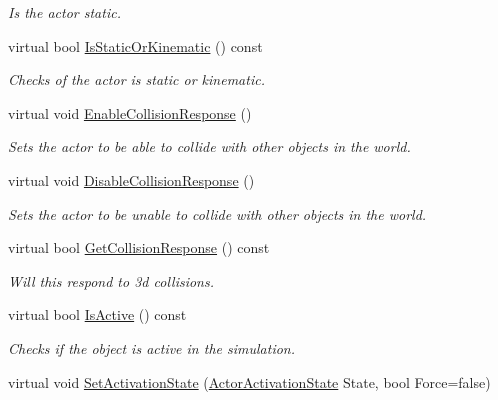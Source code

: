 \begin{DoxyCompactItemize}
\begin{DoxyCompactList}\small\item\em Is the actor static. \item\end{DoxyCompactList}\item 
virtual bool \hyperlink{classphys_1_1ActorBasePhysicsSettings_a5fe007187584b836ada963f8a23eb377}{IsStaticOrKinematic} () const 
\begin{DoxyCompactList}\small\item\em Checks of the actor is static or kinematic. \item\end{DoxyCompactList}\item 
virtual void \hyperlink{classphys_1_1ActorBasePhysicsSettings_aeb1dafd6d1e4875bf89be4de93208c03}{EnableCollisionResponse} ()
\begin{DoxyCompactList}\small\item\em Sets the actor to be able to collide with other objects in the world. \item\end{DoxyCompactList}\item 
virtual void \hyperlink{classphys_1_1ActorBasePhysicsSettings_a89e61d914542bb6e16e22e7f39ba26c1}{DisableCollisionResponse} ()
\begin{DoxyCompactList}\small\item\em Sets the actor to be unable to collide with other objects in the world. \item\end{DoxyCompactList}\item 
virtual bool \hyperlink{classphys_1_1ActorBasePhysicsSettings_aa131aa28b9e5c7a53c65c4e229f13ed1}{GetCollisionResponse} () const 
\begin{DoxyCompactList}\small\item\em Will this respond to 3d collisions. \item\end{DoxyCompactList}\item 
virtual bool \hyperlink{classphys_1_1ActorBasePhysicsSettings_aeb966cf55b9b626897731f42b5a2fc64}{IsActive} () const 
\begin{DoxyCompactList}\small\item\em Checks if the object is active in the simulation. \item\end{DoxyCompactList}\item 
virtual void \hyperlink{classphys_1_1ActorBasePhysicsSettings_ab0b1760f3730e85470097d44985a5b56}{SetActivationState} (\hyperlink{namespacephys_a7d434b1a52cf5290a9ecc972b87a6a40}{ActorActivationState} State, bool Force=false)

\end{DoxyCompactItemize}
